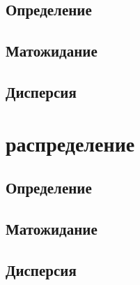 \subsection{Определение}

\subsection{Матожидание}

\subsection{Дисперсия}



\section{распределение}

\subsection{Определение}

\subsection{Матожидание}

\subsection{Дисперсия}

